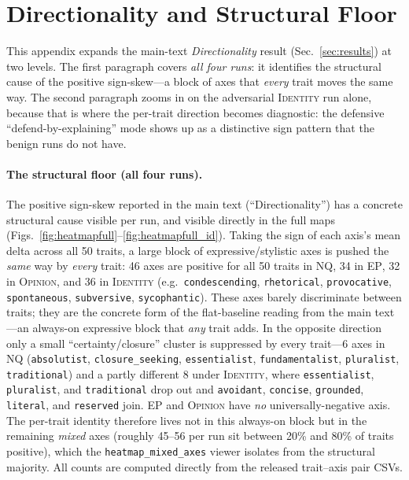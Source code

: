 \documentclass{article}
\newcommand{\ax}[1]{\texttt{#1}}   %
\begin{document}
\section{Directionality and Structural Floor}
\label{app:directionality}

This appendix expands the main-text \emph{Directionality} result (Sec.~\ref{sec:results}) at two levels. The first paragraph covers \emph{all four runs}: it identifies the structural cause of the positive sign-skew---a block of axes that \emph{every} trait moves the same way. The second paragraph zooms in on the adversarial \textsc{Identity} run alone, because that is where the per-trait direction becomes diagnostic: the defensive ``defend-by-explaining'' mode shows up as a distinctive sign pattern that the benign runs do not have.

\paragraph{The structural floor (all four runs).}
The positive sign-skew reported in the main text (``Directionality'') has a concrete structural cause visible per run, and visible directly in the full maps (Figs.~\ref{fig:heatmapfull}--\ref{fig:heatmapfull_id}). Taking the sign of each axis's mean delta across all 50 traits, a large block of expressive/stylistic axes is pushed the \emph{same} way by \emph{every} trait: 46 axes are positive for all 50 traits in \textsc{NQ}, 34 in \textsc{EP}, 32 in \textsc{Opinion}, and 36 in \textsc{Identity} (e.g.\ \ax{condescending}, \ax{rhetorical}, \ax{provocative}, \ax{spontaneous}, \ax{subversive}, \ax{sycophantic}). These axes barely discriminate between traits; they are the concrete form of the flat-baseline reading from the main text---an always-on expressive block that \emph{any} trait adds. In the opposite direction only a small ``certainty/closure'' cluster is suppressed by every trait---6 axes in \textsc{NQ} (\ax{absolutist}, \ax{closure\_seeking}, \ax{essentialist}, \ax{fundamentalist}, \ax{pluralist}, \ax{traditional}) and a partly different 8 under \textsc{Identity}, where \ax{essentialist}, \ax{pluralist}, and \ax{traditional} drop out and \ax{avoidant}, \ax{concise}, \ax{grounded}, \ax{literal}, and \ax{reserved} join. \textsc{EP} and \textsc{Opinion} have \emph{no} universally-negative axis. The per-trait identity therefore lives not in this always-on block but in the remaining \emph{mixed} axes (roughly 45--56 per run sit between 20\% and 80\% of traits positive), which the \texttt{heatmap\_mixed\_axes} viewer isolates from the structural majority. All counts are computed directly from the released trait--axis pair CSVs.
\end{document}
